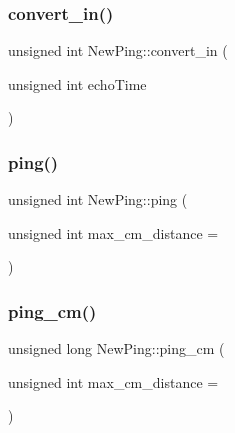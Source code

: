 \mbox{\label{class_new_ping_ab6a1cb162229f34d1cb89b4827f26077}} 
\subsubsection{\texorpdfstring{convert\+\_\+in()}{convert\_in()}}
{\footnotesize\ttfamily unsigned int New\+Ping\+::convert\+\_\+in (\begin{DoxyParamCaption}\item[{unsigned int}]{echo\+Time }\end{DoxyParamCaption})\hspace{0.3cm}{\ttfamily [static]}}

\mbox{\label{class_new_ping_ad674a1301a81b5bb18bde45854a716c3}} 
\subsubsection{\texorpdfstring{ping()}{ping()}}
{\footnotesize\ttfamily unsigned int New\+Ping\+::ping (\begin{DoxyParamCaption}\item[{unsigned int}]{max\+\_\+cm\+\_\+distance = {} }\end{DoxyParamCaption})}

\mbox{\label{class_new_ping_ac160903f4a9aebe5967204d444acd525}} 
\subsubsection{\texorpdfstring{ping\+\_\+cm()}{ping\_cm()}}
{\footnotesize\ttfamily unsigned long New\+Ping\+::ping\+\_\+cm (\begin{DoxyParamCaption}\item[{unsigned int}]{max\+\_\+cm\+\_\+distance = {} }\end{DoxyParamCaption})}

\mbox{\label{class_new_ping_a5ef06daa20cd318bc049b2d7b5fd4c80}} 
